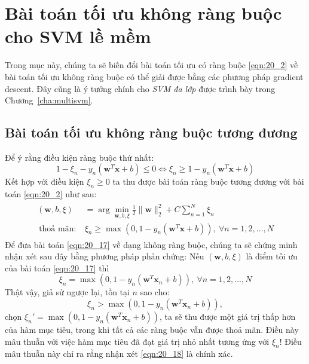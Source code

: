 \section{Bài toán tối ưu không ràng buộc cho SVM lề mềm }
Trong mục này, chúng ta sẽ biến đổi bài toán tối ưu có ràng buộc \eqref{eqn:20_2} về
bài toán tối ưu không ràng buộc có thể giải được bằng các phương
pháp gradient descent. Đây cũng là ý tưởng chính cho \textit{SVM đa lớp} được trình
bày trong Chương~\ref{cha:multisvm}.
\newpage
\subsection{Bài toán tối ưu không ràng buộc tương đương}
Để ý rằng điều kiện ràng buộc thứ nhất:
\begin{equation}
1 - \xi_n -y_n(\mathbf{w}^T\mathbf{x} + b) \leq 0 \Leftrightarrow \xi_n \geq 1 - y_n(\mathbf{w}^T\mathbf{x} + b)
\end{equation}
Kết hợp với điều kiện $\xi_n \geq 0$ ta thu được bài toán ràng buộc tương đương với bài toán \eqref{eqn:20_2} như sau:
\begin{eqnarray}
\label{eqn:20_17}
\begin{aligned}
(\mathbf{w}, b, \xi) &= \arg \min_{\mathbf{w}, b, \xi} \frac{1}{2}{\|\mathbf{w}\|_2^2} + C \sum_{n=1}^N \xi_n  \\\
\text{thoả mãn:}~ & \xi_n \geq \max(0, 1 - y_n(\mathbf{w}^T\mathbf{x} + b)), ~\forall n = 1, 2, \dots, N
\end{aligned}
\end{eqnarray}
Để đưa bài toán \eqref{eqn:20_17} về dạng không ràng buộc, chúng ta
sẽ chứng minh nhận xét sau đây bằng phương pháp phản chứng:
Nếu $(\mathbf{w}, b, \xi)$ là điểm tối ưu của bài toán \eqref{eqn:20_17} thì
\begin{equation}
\label{eqn:20_18}
\xi_n = \max(0, 1 - y_n(\mathbf{w}^T\mathbf{x}_n + b)), ~\forall n = 1, 2, \dots, N
\end{equation}
Thật vậy, giả sử ngược lại, tồn tại $n$ sao cho:
\begin{equation*}
\xi_n > \max(0, 1 - y_n(\mathbf{w}^T\mathbf{x}_n + b)),
\end{equation*}
chọn $\xi_n' = \max(0, 1 - y_n(\mathbf{w}^T\mathbf{x}_n + b))$, ta sẽ thu được
một giá trị thấp hơn của hàm mục tiêu, trong khi tất cả các ràng buộc vẫn được
thoả mãn. Điều này mâu thuẫn với việc hàm mục tiêu đã đạt giá trị nhỏ nhất tương ứng với $\xi_n$!
Điều mâu thuẫn này chỉ ra rằng nhận xét \eqref{eqn:20_18} là chính xác.

